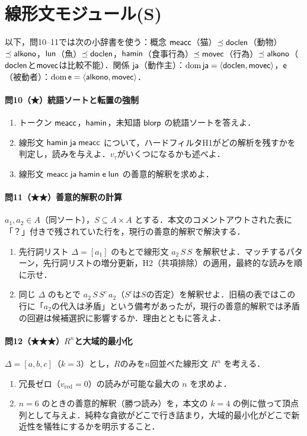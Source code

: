 \documentclass[../../main-detail.tex]{subfiles}
\begin{document}
\section{線形文モジュール(S)}

以下，問10--11では次の小辞書を使う：概念 $\textsf{meacc}$（猫）$\preceq \textsf{doclen}$（動物）$\preceq \textsf{alkono}$，$\textsf{lun}$（魚）$\preceq \textsf{doclen}$，$\textsf{hamin}$（食事行為）$\preceq \textsf{movec}$（行為）$\preceq \textsf{alkono}$（$\textsf{doclen}$と$\textsf{movec}$は比較不能）．関係 $\textsf{ja}$（動作主）：$\mathop{\mathrm{dom}}\nolimits \textsf{ja} = \langle \textsf{doclen}, \textsf{movec}\rangle$，$\textsf{e}$（被動者）：$\mathop{\mathrm{dom}}\nolimits \textsf{e} = \langle \textsf{alkono}, \textsf{movec}\rangle$．

\paragraph{問10（★）統語ソートと転置の強制}
\begin{enumerate}[label=(\alph*)]
    \item トークン $\textsf{meacc}$，$\textsf{hamin}$，未知語 $\textsf{blorp}$ の統語ソートを答えよ．
    \item 線形文 $\textsf{hamin}\; \textsf{ja}\; \textsf{meacc}$ について，ハードフィルタH1がどの解析を残すかを判定し，読みを与えよ．$v_\tau$がいくつになるかも述べよ．
    \item 線形文 $\textsf{meacc}\; \textsf{ja}\; \textsf{hamin}\; \textsf{e}\; \textsf{lun}$ の善意的解釈を求めよ．
\end{enumerate}

\paragraph{問11（★★）善意的解釈の計算}
$a_1, a_2 \in A$（同ソート），$S \subseteq A \times A$ とする．本文のコメントアウトされた表に「？」付きで残されていた行を，現行の善意的解釈で解決する．
\begin{enumerate}[label=(\alph*)]
    \item 先行詞リスト $\Delta = [a_1]$ のもとで線形文 $a_2\,S\,S$ を解釈せよ．マッチするパターン，先行詞リストの増分更新，H2（共項排除）の適用，最終的な読みを順に示せ．
    \item 同じ $\Delta$ のもとで $a_2\,S\,S^c\,a_2$（$S^c$は$S$の否定）を解釈せよ．旧稿の表ではこの行に「$a_2$の代入は矛盾」という備考があったが，現行の善意的解釈では矛盾の回避は候補選択に影響するか．理由とともに答えよ．
\end{enumerate}

\paragraph{問12（★★★）$R^n$と大域的最小化}
$\Delta = [a, b, c]$（$k = 3$）とし，$R$のみを$n$回並べた線形文 $R^n$ を考える．
\begin{enumerate}[label=(\alph*)]
    \item 冗長ゼロ（$v_{\mathrm{red}} = 0$）の読みが可能な最大の $n$ を求めよ．
    \item $n = 6$ のときの善意的解釈（勝つ読み）を，本文の $k=4$ の例に倣って頂点列として与えよ．純粋な貪欲がどこで行き詰まり，大域的最小化がどこで新近性を犠牲にするかを明示すること．
\end{enumerate}
\end{document}
